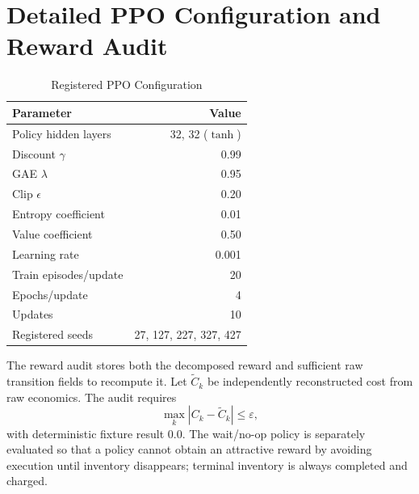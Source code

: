 \documentclass[journal,10pt]{IEEEtran}
\newcommand{\1}{\mathbf{1}}
\begin{document}
\section{Detailed PPO Configuration and Reward Audit}
\begin{table}[h]
\centering
\caption{Registered PPO Configuration}
\label{tab:ppo-config}
\begin{tabular}{lr}
\toprule
Parameter & Value \\
\midrule
Policy hidden layers & 32, 32 ($\tanh$) \\
Discount $\gamma$ & 0.99 \\
GAE $\lambda$ & 0.95 \\
Clip $\epsilon$ & 0.20 \\
Entropy coefficient & 0.01 \\
Value coefficient & 0.50 \\
Learning rate & 0.001 \\
Train episodes/update & 20 \\
Epochs/update & 4 \\
Updates & 10 \\
Registered seeds & 27, 127, 227, 327, 427 \\
\bottomrule
\end{tabular}
\end{table}

The reward audit stores both the decomposed reward and sufficient raw transition fields to recompute it. Let $\widetilde C_k$ be independently reconstructed cost from raw economics. The audit requires
\begin{equation}
\max_k |C_k-\widetilde C_k| \le \varepsilon,
\end{equation}
with deterministic fixture result 0.0. The wait/no-op policy is separately evaluated so that a policy cannot obtain an attractive reward by avoiding execution until inventory disappears; terminal inventory is always completed and charged.
\end{document}
